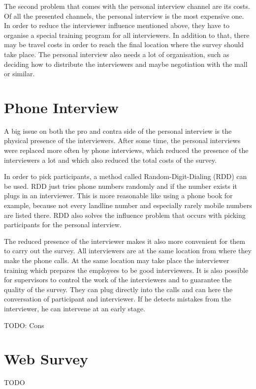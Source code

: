 \documentclass{report}
\begin{document}
The second problem that comes with the personal interview channel are its costs. Of all the presented channels, the personal interview is the most expensive one. In order to reduce the interviewer influence mentioned above, they have to organise a special training program for all interviewers. In addition to that, there may be travel costs in order to reach the final location where the survey should take place. The personal interview also needs a lot of organisation, such as deciding how to distribute the interviewers and maybe negotiation with the mall or similar.

\section{Phone Interview}

A big issue on both the pro and contra side of the personal interview is the physical presence of the interviewers. After some time, the personal interviews were replaced more often by phone interviews, which reduced the presence of the interviewers a lot and which also reduced the total costs of the survey.

In order to pick participants, a method called Random-Digit-Dialing (RDD) can be used. RDD just tries phone numbers randomly and if the number exists it plugs in an interviewer. This is more reasonable like using a phone book for example, because not every landline number and especially rarely mobile numbers are listed there. RDD also solves the influence problem that occurs with picking participants for the personal interview.

The reduced presence of the interviewer makes it also more convenient for them to carry out the survey. All interviewers are at the same location from where they make the phone calls. At the same location may take place the interviewer training which prepares the employees to be good interviewers. It is also possible for supervisors to control the work of the interviewers and to guarantee the quality of the survey. They can plug directly into the calls and can here the conversation of participant and interviewer. If he detects mistakes from the interviewer, he can intervene at an early stage.

TODO: Cons

\section{Web Survey}

TODO
\end{document}
